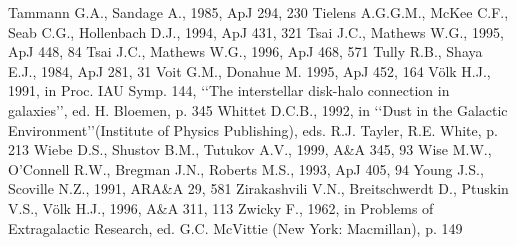 \documentclass[]{aa}
\begin{document}
\begin{thebibliography}{}
\bibitem{} Tammann G.A., Sandage A., 1985, ApJ 294, 230
\bibitem{} Tielens A.G.G.M., McKee C.F., Seab C.G., Hollenbach
D.J., 1994, ApJ 431, 321
\bibitem{} Tsai J.C., Mathews W.G., 1995, ApJ 448, 84
\bibitem{} Tsai J.C., Mathews W.G., 1996, ApJ 468, 571
\bibitem{} Tully R.B., Shaya E.J., 1984, ApJ 281, 31
\bibitem{} Voit G.M., Donahue M. 1995, ApJ 452, 164
\bibitem{} V\"olk H.J., 1991, in Proc. IAU Symp. 144, 
\lq\lq The interstellar disk-halo connection in galaxies\rq\rq,
ed. H. Bloemen, p. 345
\bibitem{} Whittet D.C.B., 1992, in \lq\lq Dust in the Galactic 
Environment\rq\rq (Institute of Physics Publishing), eds. R.J. Tayler,
R.E. White, p. 213
\bibitem{} Wiebe D.S., Shustov B.M., Tutukov A.V., 1999, A\&A 345, 93
\bibitem{} Wise M.W., O'Connell R.W., Bregman J.N., Roberts M.S., 1993, ApJ
405, 94
\bibitem{} Young J.S., Scoville N.Z., 1991, ARA\&A  29, 581
\bibitem{} Zirakashvili V.N., Breitschwerdt D., Ptuskin V.S., V\"olk
H.J., 1996, A\&A 311, 113
\bibitem{} Zwicky F., 1962, in Problems of Extragalactic Research, ed. G.C. 
McVittie (New York: Macmillan), p. 149
\end{thebibliography}
\end{document}
